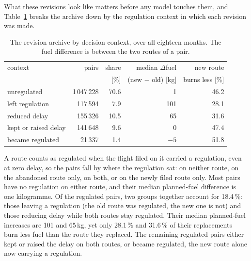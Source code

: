 \documentclass[a4paper,conference]{IEEEtran}
\begin{document}
What these revisions look like matters before any model touches them, and
Table~\ref{tab:composition} breaks the archive down by the regulation
context in which each revision was made.

\begin{table}[t]
\caption{The revision archive by decision context, over all eighteen months.
The fuel difference is between the two routes of a pair.}
\label{tab:composition}
\centering\footnotesize
\setlength{\tabcolsep}{3pt}
\begin{tabular}{lrrrr}
\toprule
context & pairs & share & median $\Delta$fuel & new route \\
        &       & [\%]  & (new $-$ old) [kg]  & burns less [\%] \\
\midrule
unregulated          & 1\,047\,228 & 70.6 & 1    & 46.2 \\
left regulation      & 117\,594    & 7.9  & 101  & 28.1 \\
reduced delay        & 155\,326    & 10.5 & 65   & 31.6 \\
kept or raised delay & 141\,648    & 9.6  & 0    & 47.4 \\
became regulated     & 21\,337     & 1.4  & $-5$ & 51.8 \\
\bottomrule
\end{tabular}
\end{table}

A route counts as regulated when the flight filed on it carried a
regulation, even at zero delay, so the pairs fall by where the regulation
sat: on neither route, on the abandoned route only, on both, or on the newly
filed route only. Most pairs have no regulation on either route, and their
median planned-fuel difference is one kilogramme. Of the regulated pairs,
two groups together account for 18.4\,\%: those leaving a regulation (the old
route was regulated, the new one is not) and those reducing delay while both
routes stay regulated. Their median planned-fuel increases are 101 and
65\,kg, yet only 28.1\,\% and 31.6\,\% of their replacements burn less fuel
than the route they replaced. The remaining regulated pairs either kept or
raised the delay on both routes, or became regulated, the new route alone
now carrying a regulation.
\end{document}
